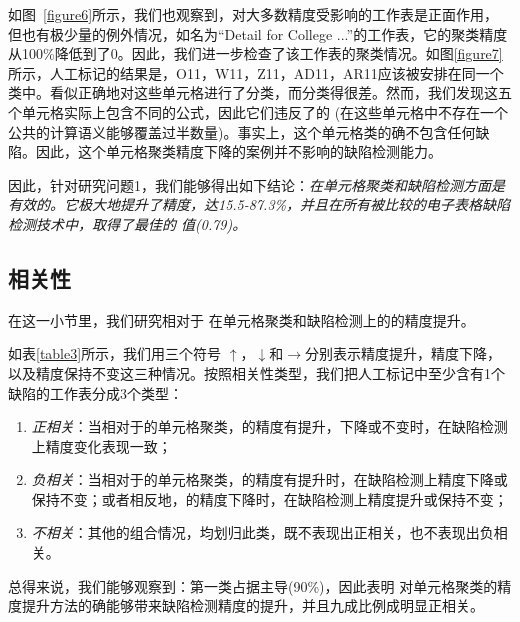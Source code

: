 


如图~\ref{figure6}所示，我们也观察到，\wa 对大多数精度受影响的工作表是正面作用，但也有极少量的例外情况，如名为“Detail for College ...”的工作表，它的聚类精度从100\%降低到了0。因此，我们进一步检查了该工作表的聚类情况。如图\ref{figure7}所示，人工标记的结果是，{O11，W11，Z11，AD11，AR11}应该被安排在同一个类中。\cu 看似正确地对这些单元格进行了分类，而\wa 分类得很差。然而，我们发现这五个单元格实际上包含不同的公式，因此它们违反了\wa 的 \wcvp (在这些单元格中不存在一个公共的计算语义能够覆盖过半数量)。事实上，这个单元格类的确不包含任何缺陷。因此，这个单元格聚类精度下降的案例并不影响\wa 的缺陷检测能力。

因此，针对研究问题1，我们能够得出如下结论：\textit{\wa 在单元格聚类和缺陷检测方面是有效的。它极大地提升了精度，达15.5-87.3\%，并且在所有被比较的电子表格缺陷检测技术中，取得了最佳的 \fmd 值(0.79)。}

\subsection{相关性}



在这一小节里，我们研究\wa 相对于 \cu 在单元格聚类和缺陷检测上的的精度提升。

如表\ref{table3}所示，我们用三个符号 $\uparrow$，$\downarrow$和$\to$分别表示精度提升，精度下降，以及精度保持不变这三种情况。按照相关性类型，我们把人工标记中至少含有1个缺陷的工作表分成3个类型：
\begin{enumerate}
    \item \textit{正相关}：当相对于\cu 的单元格聚类，\wa 的精度有提升，下降或不变时，在缺陷检测上精度变化表现一致；
    \item \textit{负相关}：当相对于\cu 的单元格聚类，\wa 的精度有提升时，在缺陷检测上精度下降或保持不变；或者相反地，\wa 的精度下降时，在缺陷检测上精度提升或保持不变；
    \item \textit{不相关}：其他的组合情况，均划归此类，既不表现出正相关，也不表现出负相关。
\end{enumerate}
总得来说，我们能够观察到：第一类占据主导(90\%)，因此表明 \wa 对单元格聚类的精度提升方法的确能够带来缺陷检测精度的提升，并且九成比例成明显正相关。




